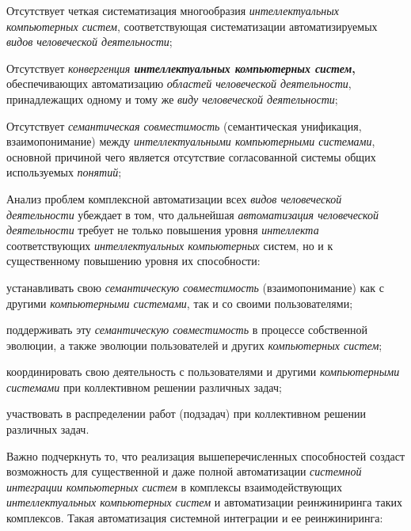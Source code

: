 \begin{textitemize}
	\item
	Отсутствует четкая систематизация многообразия \textit{интеллектуальных компьютерных систем}, соответствующая систематизации автоматизируемых \textit{видов человеческой деятельности};
	\item
	Отсутствует \textit{конвергенция \textbf{интеллектуальных компьютерных систем}}\textbf{,} обеспечивающих автоматизацию \textit{областей человеческой деятельности}, принадлежащих одному и тому же \textit{виду человеческой деятельности};
	\item
	Отсутствует \textit{семантическая совместимость} (семантическая унификация, взаимопонимание) между \textit{интеллектуальными компьютерными системами}, основной причиной чего является отсутствие согласованной системы общих используемых \textit{понятий};
	\item
	Анализ проблем комплексной автоматизации всех \textit{видов человеческой деятельности} убеждает в том, что дальнейшая \textit{автоматизация человеческой деятельности} требует не только повышения уровня \textit{интеллекта} соответствующих \textit{интеллектуальных компьютерных} систем, но и к существенному повышению уровня их способности:
	\begin{textitemize}
		\item
		устанавливать свою \textit{семантическую совместимость} (взаимопонимание) как с другими \textit{компьютерными системами}, так и со своими пользователями;
		\item
		поддерживать эту \textit{семантическую совместимость} в процессе собственной эволюции, а также эволюции пользователей и других \textit{компьютерных систем};
		\item
		координировать свою деятельность с пользователями и другими \textit{компьютерными системами} при коллективном решении различных задач;
		\item
		участвовать в распределении работ (подзадач) при коллективном решении различных задач.
	\end{textitemize}
\end{textitemize}


Важно подчеркнуть то, что реализация вышеперечисленных способностей создаст возможность для существенной и даже полной автоматизации \textit{системной интеграции компьютерных систем} в комплексы взаимодействующих \textit{интеллектуальных компьютерных систем} и автоматизации реинжиниринга таких комплексов. Такая автоматизация системной интеграции и ее реинжиниринга:

